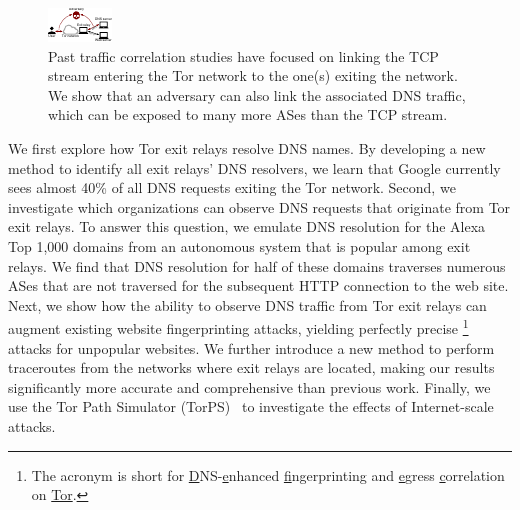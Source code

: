 \begin{figure}[t]
	\centering
	\includegraphics[width=0.65\linewidth]{figures/attack-concept.pdf}
	\caption{Past traffic correlation studies have focused on linking the TCP
		stream entering the Tor network to the one(s) exiting the network.  We
		show that an adversary can also link the associated DNS traffic, which
		can be exposed to many more ASes than the TCP stream.}
	\label{fig:overview}
\end{figure}

We first explore how Tor exit relays resolve DNS names.  By developing a new
method to identify all exit relays' DNS resolvers, we learn that Google
currently sees almost 40\% of all DNS requests exiting the Tor network.  Second,
we investigate which organizations can observe DNS requests that originate from
Tor exit relays.  To answer this question, we emulate DNS resolution for the
Alexa Top 1,000 domains from an autonomous system that is popular among exit
relays.  We find that DNS resolution for half of these domains traverses numerous
ASes that are not traversed for the subsequent HTTP connection to the web site.  
Next, we show how the ability to observe DNS 
traffic from Tor exit relays can augment existing website fingerprinting
attacks, yielding perfectly precise \name\footnote{The acronym is short for
\underline{D}NS-\underline{e}nhanced \underline{f}ingerprinting and
\underline{e}gress \underline{c}orrelation on \underline{Tor}.} attacks for
unpopular websites. 
We further introduce a new method to perform traceroutes from the networks where
exit relays are located, making our results significantly more accurate and
comprehensive than previous work. 
Finally, we use the Tor Path Simulator (TorPS)~\cite{TorPS}
to investigate the effects of Internet-scale \name attacks.

